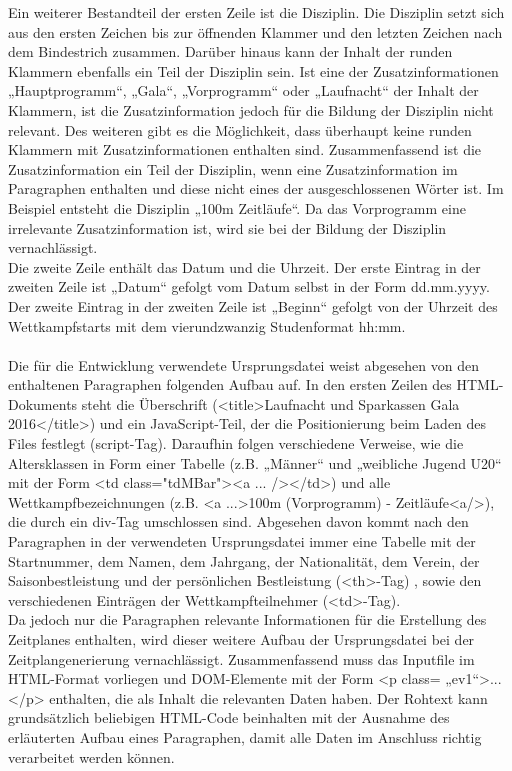 {Ein weiterer Bestandteil der ersten Zeile ist die Disziplin. Die Disziplin setzt sich aus den ersten Zeichen bis zur öffnenden Klammer und den letzten Zeichen nach dem Bindestrich zusammen.
Darüber hinaus kann der Inhalt der runden Klammern ebenfalls ein Teil der Disziplin sein. Ist eine der Zusatzinformationen „Hauptprogramm“, „Gala“, „Vorprogramm“ oder „Laufnacht“ der Inhalt der Klammern, ist die Zusatzinformation jedoch für die Bildung der Disziplin nicht relevant. Des weiteren gibt es die Möglichkeit, dass überhaupt keine runden Klammern mit Zusatzinformationen enthalten sind. Zusammenfassend ist die Zusatzinformation ein Teil der Disziplin, wenn eine Zusatzinformation im Paragraphen enthalten und diese nicht eines der ausgeschlossenen Wörter ist.
Im Beispiel entsteht die Disziplin „100m Zeitläufe“. Da das Vorprogramm eine irrelevante Zusatzinformation ist, wird sie bei der Bildung der Disziplin vernachlässigt.
\\
Die zweite Zeile enthält das Datum und die Uhrzeit. Der erste Eintrag in der zweiten Zeile ist „Datum“ gefolgt vom Datum selbst in der Form dd.mm.yyyy. Der zweite Eintrag in der zweiten Zeile ist „Beginn“ gefolgt von der Uhrzeit des Wettkampfstarts mit dem vierundzwanzig Studenformat hh:mm.\\
\\
Die für die Entwicklung verwendete Ursprungsdatei weist abgesehen von den enthaltenen Paragraphen folgenden Aufbau auf. In den ersten Zeilen des HTML-Dokuments steht die Überschrift (<title>Laufnacht und Sparkassen Gala 2016</title>) und ein JavaScript-Teil, der die Positionierung beim Laden des Files festlegt (script-Tag). Daraufhin folgen verschiedene Verweise, wie die Altersklassen in Form einer Tabelle (z.B. „Männer“ und „weibliche Jugend U20“ mit der Form <td class="tdMBar"><a ... /></td>) und alle Wettkampfbezeichnungen (z.B. <a ...>100m (Vorprogramm) - Zeitläufe<a/>), die durch ein div-Tag umschlossen sind. 
Abgesehen davon kommt nach den Paragraphen in der verwendeten Ursprungsdatei immer eine Tabelle mit der Startnummer, dem Namen, dem Jahrgang, der Nationalität, dem Verein, der Saisonbestleistung und der persönlichen Bestleistung (<th>-Tag) , sowie den verschiedenen Einträgen der Wettkampfteilnehmer (<td>-Tag). \\
Da jedoch nur die Paragraphen relevante Informationen für die Erstellung des Zeitplanes enthalten, wird dieser weitere Aufbau der Ursprungsdatei bei der Zeitplangenerierung vernachlässigt. 
Zusammenfassend muss das Inputfile im HTML-Format vorliegen und DOM-Elemente mit der Form <p class= „ev1“>...</p> enthalten, die als Inhalt die relevanten Daten haben. Der Rohtext kann grundsätzlich beliebigen HTML-Code beinhalten mit der Ausnahme des erläuterten Aufbau eines Paragraphen, damit alle Daten im Anschluss richtig verarbeitet werden können.  

}
